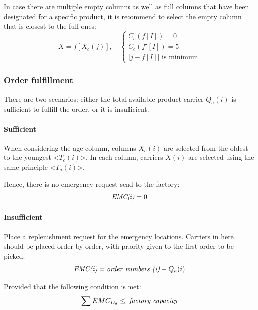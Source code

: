 In case there are multiple empty columns as well as full columns that have been designated for a specific product, it is recommend to select the empty column that is closest to the full ones:
    \begin{equation}\label{eq:empty find X}
        X = f[X_c(j)], \quad
            \begin{cases}
                C_c(f[I]) = 0 \\
                C_c(f'[I]) = 5 \\
                |j-f[I]| \text{ is minimum}
            \end{cases}
    \end{equation}

\subsubsection{Order fulfillment}

There are two scenarios: either the total available product carrier ${ Q_a(i) }$ is \linebreak sufficient to fulfill the order, or it is insufficient.

\paragraph{Sufficient}\mbox{}

When considering the age column, columns ${ X_c(i) }$ are selected from the oldest to the youngest <${ T_c(i) }$>. In each column, carriers ${ X(i) }$ are selected using the same principle <${ T_a(i) }$>.

    Hence, there is no emergency request send to the factory:
    \begin{equation}\label{eq:no emc}
        \text{\emph{EMC(i)}} =  0
    \end{equation}

\paragraph{Insufficient}\mbox{}

Place a replenishment request for the emergency locations. Carriers in here should be placed order by order, with priority given to the first order to be picked.
    \begin{equation}\label{eq:emc}
        \text{\emph{EMC(i)}} =  
        \text{\emph{order numbers (i)}} - Q_a(i)
    \end{equation}

    Provided that the following condition is met:
    \begin{equation}\label{eq:sum emc}
        \sum EMC_{D_d} \leq \text{\emph{ factory capacity}}
    \end{equation}

